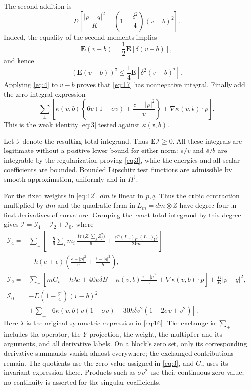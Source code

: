 The second addition is
\begin{equation}
 D\left[\frac{|p-q|^2}{K}
       -\left(1-\frac{\delta^2}{4}\right)(v-b)^2\right].
\tag{17}\label{eq:17}
\end{equation}
Indeed, the equality of the second moments implies
\[
 \mathbf E(v-b)=\frac12\mathbf E[\delta(v-b)],
\]
and hence
\[
 (\mathbf E(v-b))^2\le\frac14\mathbf E[\delta^2(v-b)^2].
\]
Applying \eqref{eq:4} to $v-b$ proves that \eqref{eq:17} has
nonnegative integral. Finally add the zero-integral expression
\begin{equation}
 \sum_\pm\left[
 \kappa(v,b)\left\{6v(1-\sigma v)+\frac{e-|p|^2}{v}\right\}
       +\nabla\kappa(v,b)\cdot p\right].
\tag{18}\label{eq:18}
\end{equation}
This is the weak identity \eqref{eq:3} tested against $\kappa(v,b)$.

Let $\mathcal I$ denote the resulting total integrand. Thus
$\mathbf E\mathcal I\ge0$. All these integrals are legitimate without
a positive lower bound for either norm: $e/v$ and $\bar e/b$ are
integrable by the regularization proving \eqref{eq:3}, while the energies
and all scalar coefficients are bounded. Bounded Lipschitz test functions
are admissible by smooth approximation, uniformly and in $H^1$.

For the fixed weights in \eqref{eq:12}, $dm$ is linear in $p,q$.
Thus the cubic contraction multiplied by $dm$ and the quadratic form
in $L_m=dm\otimes Z$ have degree four in first derivatives of curvature.
Grouping the exact total integrand by this degree gives
$\mathcal I=\mathcal I_4+\mathcal I_2+\mathcal I_0$, where
\[
\begin{aligned}
\mathcal I_4={}&
 \sum_\pm\left[
 -\frac56\sum_i m_i\,
   \frac{\operatorname{tr}\bigl(Z_i\sum_j Z_j^2\bigr)}6
 +\frac{\langle\mathcal P(L_m)_Y,(L_m)_Y\rangle}{24m}
 \right]\\
 &-h(e+\bar e)
 \left(\frac{e-|p|^2}{v}+\frac{\bar e-|q|^2}{b}\right),\\[1mm]
\mathcal I_2={}&
 \sum_\pm\left[
 mG_v+h\lambda e+40h\delta B
 +\kappa(v,b)\frac{e-|p|^2}{v}
 +\nabla\kappa(v,b)\cdot p
 \right]
 +\frac DK|p-q|^2,\\[1mm]
\mathcal I_0={}&
 -D\left(1-\frac{\delta^2}{4}\right)(v-b)^2\\
 &+\sum_\pm\left[
 6\kappa(v,b)v(1-\sigma v)
 -30h\delta v^2(1-2\sigma v+v^2)
 \right].
\end{aligned}
\]
Here $\lambda$ is the original symmetric expression in \eqref{eq:16}.
The exchange in $\sum_\pm$ includes the operator, the $Y$-projection,
the weight, the multiplier and its arguments, and all derivative labels.
On a block's zero set, only its corresponding derivative summands vanish
almost everywhere; the exchanged contributions remain. The quotients
use the zero value assigned in \eqref{eq:3}, and $G_v$ uses its invariant
expression there. Products such as $\sigma v^2$ use their continuous
zero value; no continuity is asserted for the singular coefficients.

